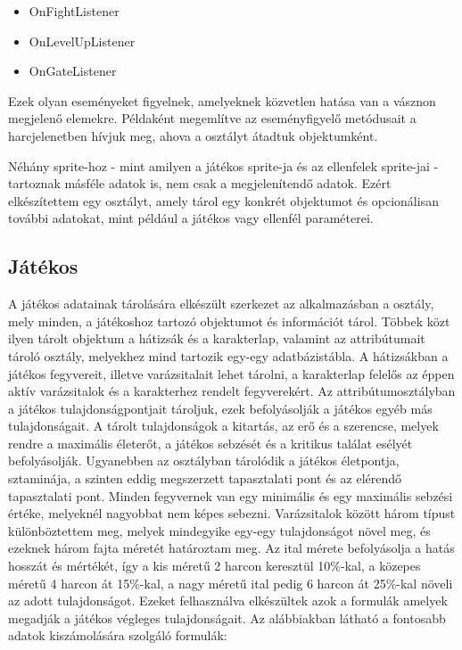\begin{itemize}
	\item OnFightListener
	\item OnLevelUpListener
	\item OnGateListener
\end{itemize}

Ezek olyan eseményeket figyelnek, amelyeknek közvetlen hatása van a vásznon megjelenő elemekre. 
Példaként megemlítve az  eseményfigyelő metódusait a harcjelenetben hívjuk meg, ahova a  osztályt átadtuk  objektumként. 

Néhány sprite-hoz - mint amilyen a játékos sprite-ja és az ellenfelek sprite-jai - tartoznak másféle adatok is, nem csak a megjelenítendő adatok. 
Ezért elkészítettem egy  osztályt, amely tárol egy konkrét  objektumot és opcionálisan további adatokat, mint például a játékos vagy ellenfél paraméterei. 

\subsection*{Játékos}
\label{jatekos}
A játékos adatainak tárolására elkészült szerkezet az alkalmazásban a  osztály, mely minden, a játékoshoz tartozó objektumot és információt tárol. 
Többek közt ilyen tárolt objektum a hátizsák és a karakterlap, valamint az attribútumait tároló osztály, melyekhez mind tartozik egy-egy adatbázistábla. 
A hátizsákban a játékos fegyvereit, illetve varázsitalait lehet tárolni, a karakterlap felelős az éppen aktív varázsitalok és a karakterhez rendelt fegyverekért. 
Az attribútumosztályban a játékos tulajdonságpontjait tároljuk, ezek befolyásolják a játékos egyéb más tulajdonságait. 
A tárolt tulajdonságok a kitartás, az erő és a szerencse, melyek rendre a maximális életerőt, a játékos sebzését és a kritikus találat esélyét befolyásolják. 
Ugyanebben az osztályban tárolódik a játékos életpontja, sztaminája, a szinten eddig megszerzett tapasztalati pont és az elérendő tapasztalati pont. 
Minden fegyvernek van egy minimális és egy maximális sebzési értéke, melyeknél nagyobbat nem képes sebezni. 
Varázsitalok között három típust különböztettem meg, melyek mindegyike egy-egy tulajdonságot növel meg, és ezeknek három fajta méretét határoztam meg. 
Az ital mérete befolyásolja a hatás hosszát és mértékét, így a kis méretű 2 harcon keresztül 10\%-kal, a közepes méretű 4 harcon át 15\%-kal, a nagy méretű ital pedig 6 harcon át 25\%-kal növeli az adott tulajdonságot. 
Ezeket felhasználva elkészültek azok a formulák amelyek megadják a játékos végleges tulajdonságait. 
Az alábbiakban látható a fontosabb adatok kiszámolására szolgáló formulák:

